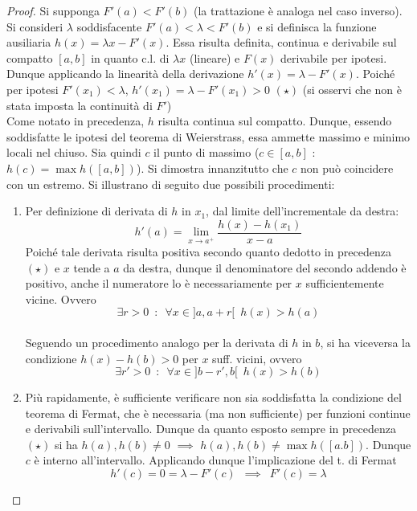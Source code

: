 \documentclass[10pt]{article}
\theoremstyle{plain}
\begin{document}
\begin{proof}
    Si supponga $F'(a) < F'(b)$ (la trattazione è analoga nel caso inverso). Si consideri $\lambda$ soddisfacente $F'(a) < \lambda < F'(b)$ e si definisca la funzione ausiliaria $h(x) = \lambda x - F'(x)$. Essa risulta definita, continua e derivabile sul compatto $[a,b]$ in quanto c.l. di $\lambda x$ (lineare) e $F(x)$ derivabile per ipotesi. Dunque applicando la linearità della derivazione $h'(x) = \lambda - F'(x)$. Poiché per ipotesi $F'(x_1) < \lambda$, $h'(x_1) = \lambda - F'(x_1) > 0$ $(\star)$ (si osservi che non è stata imposta la continuità di $F'$)
    \\Come notato in precedenza, $h$ risulta continua sul compatto. Dunque, essendo soddisfatte le ipotesi del teorema di Weierstrass, essa ammette massimo e minimo locali nel chiuso. Sia quindi $c$ il punto di massimo ($c \in [a,b]$ : $h(c) = \max h([a,b])$). Si dimostra innanzitutto che $c$ non può coincidere con un estremo. Si illustrano di seguito due possibili procedimenti:
    \begin{enumerate}
        \item Per definizione di derivata di $h$ in $x_1$, dal limite dell'incrementale da destra:
        \[h'(a) = \lim \limits_{x \rightarrow a^+} \frac{h(x) - h(x_1)}{x - a}\]
        Poiché tale derivata risulta positiva secondo quanto dedotto in precedenza $(\star)$ e $x$ tende a $a$ da destra, dunque il denominatore del secondo addendo è positivo, anche il numeratore lo è necessariamente per $x$ sufficientemente vicine. Ovvero 
        \[\exists r > 0 \enspace  : \enspace \forall x \in ]a, a + r[ \enspace  h(x) > h(a)\]
        \\Seguendo un procedimento analogo per la derivata di $h$ in $b$, si ha viceversa la condizione $h(x) - h(b) > 0$ per $x$ suff. vicini, ovvero
        \[\exists r'>0 \enspace : \enspace \forall x \in ]b - r', b[ \enspace h(x) > h(b)\]
        \item Più rapidamente, è sufficiente verificare non sia soddisfatta la condizione del teorema di Fermat, che è necessaria (ma non sufficiente) per funzioni continue e derivabili sull'intervallo. Dunque da quanto esposto sempre in precedenza $(\star)$ si ha $h(a), h(b) \neq 0$ $\implies$ $h(a) , h(b) \neq \max h([a.b])$. Dunque $c$ è interno all'intervallo. Applicando dunque l'implicazione del t. di Fermat 
        \[h'(c) = 0 = \lambda - F'(c) \enspace \implies \enspace F'(c) = \lambda\]
    \end{enumerate}
\end{proof}
\end{document}

